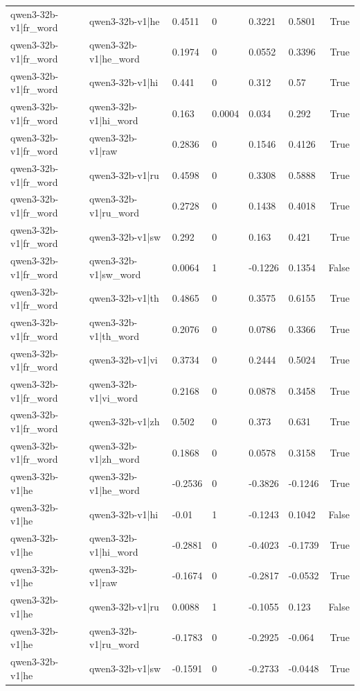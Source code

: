 \begin{table}
\begin{tabular}{llllllr}
qwen3-32b-v1|fr_word & qwen3-32b-v1|he & 0.4511 & 0 & 0.3221 & 0.5801 & True \\
qwen3-32b-v1|fr_word & qwen3-32b-v1|he_word & 0.1974 & 0 & 0.0552 & 0.3396 & True \\
qwen3-32b-v1|fr_word & qwen3-32b-v1|hi & 0.441 & 0 & 0.312 & 0.57 & True \\
qwen3-32b-v1|fr_word & qwen3-32b-v1|hi_word & 0.163 & 0.0004 & 0.034 & 0.292 & True \\
qwen3-32b-v1|fr_word & qwen3-32b-v1|raw & 0.2836 & 0 & 0.1546 & 0.4126 & True \\
qwen3-32b-v1|fr_word & qwen3-32b-v1|ru & 0.4598 & 0 & 0.3308 & 0.5888 & True \\
qwen3-32b-v1|fr_word & qwen3-32b-v1|ru_word & 0.2728 & 0 & 0.1438 & 0.4018 & True \\
qwen3-32b-v1|fr_word & qwen3-32b-v1|sw & 0.292 & 0 & 0.163 & 0.421 & True \\
qwen3-32b-v1|fr_word & qwen3-32b-v1|sw_word & 0.0064 & 1 & -0.1226 & 0.1354 & False \\
qwen3-32b-v1|fr_word & qwen3-32b-v1|th & 0.4865 & 0 & 0.3575 & 0.6155 & True \\
qwen3-32b-v1|fr_word & qwen3-32b-v1|th_word & 0.2076 & 0 & 0.0786 & 0.3366 & True \\
qwen3-32b-v1|fr_word & qwen3-32b-v1|vi & 0.3734 & 0 & 0.2444 & 0.5024 & True \\
qwen3-32b-v1|fr_word & qwen3-32b-v1|vi_word & 0.2168 & 0 & 0.0878 & 0.3458 & True \\
qwen3-32b-v1|fr_word & qwen3-32b-v1|zh & 0.502 & 0 & 0.373 & 0.631 & True \\
qwen3-32b-v1|fr_word & qwen3-32b-v1|zh_word & 0.1868 & 0 & 0.0578 & 0.3158 & True \\
qwen3-32b-v1|he & qwen3-32b-v1|he_word & -0.2536 & 0 & -0.3826 & -0.1246 & True \\
qwen3-32b-v1|he & qwen3-32b-v1|hi & -0.01 & 1 & -0.1243 & 0.1042 & False \\
qwen3-32b-v1|he & qwen3-32b-v1|hi_word & -0.2881 & 0 & -0.4023 & -0.1739 & True \\
qwen3-32b-v1|he & qwen3-32b-v1|raw & -0.1674 & 0 & -0.2817 & -0.0532 & True \\
qwen3-32b-v1|he & qwen3-32b-v1|ru & 0.0088 & 1 & -0.1055 & 0.123 & False \\
qwen3-32b-v1|he & qwen3-32b-v1|ru_word & -0.1783 & 0 & -0.2925 & -0.064 & True \\
qwen3-32b-v1|he & qwen3-32b-v1|sw & -0.1591 & 0 & -0.2733 & -0.0448 & True \\

\end{tabular}
\end{table}
